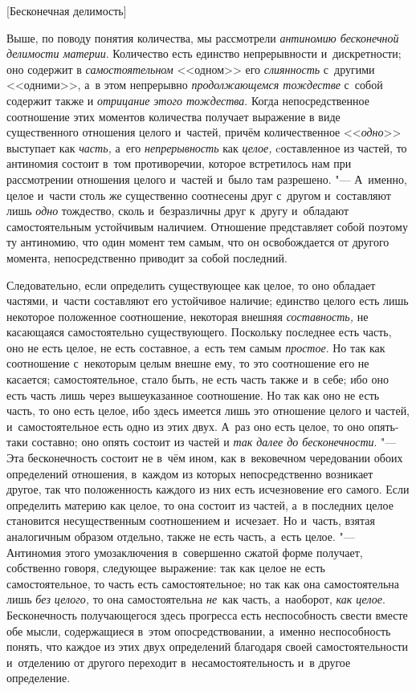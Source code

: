 %
  {[Бесконечная делимость]}

Выше, по поводу понятия количества, мы рассмотрели
{\em антиномию бесконечной делимости материи}.
Количество есть единство непрерывности и~дискретности; оно содержит в
{\em самостоятельном} <<одном>> его
{\em слиянность} с~другими <<одними>>, а~в этом
непрерывно {\em продолжающемся тождестве} с~собой
содержит также и {\em отрицание этого тождества}. Когда
непосредственное соотношение этих моментов количества получает выражение в
виде существенного отношения целого и~частей, причём количественное
<<{\em одно}>> выступает как {\em часть,} а~его
{\em непрерывность} как {\em целое,} cоставленное из частей, то антиномия
состоит в~том противоречии, которое встретилось нам при рассмотрении
отношения целого и~частей и~было там разрешено. "--- А~именно, целое и~части
столь же существенно соотнесены друг с~другом и~составляют лишь
{\em одно} тождество, сколь и~безразличны друг к~другу
и~обладают самостоятельным устойчивым наличием. Отношение представляет
собой поэтому ту антиномию, что один момент тем самым, что он освобождается
от другого момента, непосредственно приводит за собой последний.

Следовательно, если определить существующее как целое, то оно обладает
частями, и~части составляют его устойчивое наличие; единство целого есть
лишь некоторое положенное соотношение, некоторая внешняя
{\em составность,} не касающаяся самостоятельно
существующего. Поскольку последнее есть часть, оно не есть целое, не есть
составное, а~есть тем самым {\em простое}. Но так как
соотношение с~некоторым целым внешне ему, то это соотношение его не
касается; самостоятельное, стало быть, не есть часть также и~в себе; ибо
оно есть часть лишь через вышеуказанное соотношение. Но так как оно не есть
часть, то оно есть целое, ибо здесь имеется лишь это отношение целого и
частей, и~самостоятельное есть одно из этих двух. А~раз оно есть целое,
то оно опять-таки составно; оно опять состоит из частей и
{\em так далее до бесконечности}. "--- Эта бесконечность
состоит не в~чём ином, как в~вековечном чередовании обоих определений
отношения, в~каждом из которых непосредственно возникает другое, так что
положенность каждого из них есть исчезновение его самого. Если определить
материю как целое, то она состоит из частей, а~в последних целое становится
несущественным соотношением и~исчезает. Но и~часть, взятая аналогичным
образом отдельно, также не есть часть, а~есть целое. "--- Антиномия этого
умозаключения в~совершенно сжатой форме получает, собственно говоря,
следующее выражение: так как целое не есть самостоятельное, то часть есть
самостоятельное; но так как она самостоятельна лишь
{\em без целого,} то она самостоятельна
{\em не}~как часть, а~наоборот,
{\em как целое}. Бесконечность получающегося здесь
прогресса есть неспособность свести вместе обе мысли, содержащиеся в~этом
опосредствовании, а~именно неспособность понять, что каждое из этих двух
определений благодаря своей самостоятельности и~отделению от другого
переходит в~несамостоятельность и~в другое определение.



